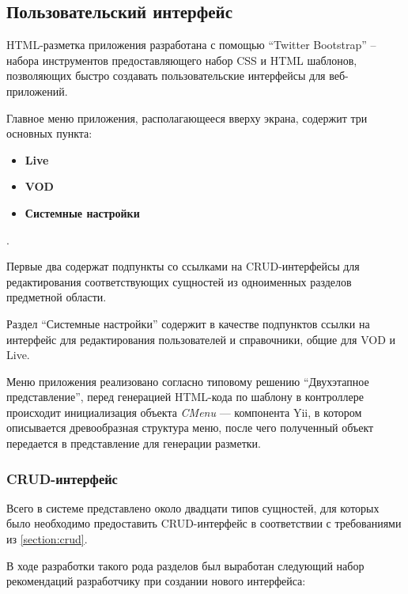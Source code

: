 \subsection{Пользовательский интерфейс}

HTML-разметка приложения разработана с помощью ``Twitter Bootstrap'' -- набора инструментов
предоставляющего набор CSS и HTML шаблонов, позволяющих быстро создавать пользовательские
интерфейсы для веб-приложений.


Главное меню приложения, располагающееся вверху экрана, содержит три основных пункта:
\begin{itemize}
\item{
\textbf{Live}
}
\item{\textbf{VOD}}
\item{\textbf{Системные настройки}}
\end{itemize}.

Первые два содержат подпункты со ссылками на CRUD-интерфейсы для редактирования
соответствующих сущностей из одноименных разделов предметной области.

Раздел ``Системные настройки'' содержит в качестве подпунктов ссылки на интерфейс для 
редактирования пользователей и справочники, общие для VOD и Live.

Меню приложения реализовано согласно типовому решению ``Двухэтапное представление''\cite{fowler},
перед генерацией HTML-кода по шаблону в контроллере происходит инициализация объекта 
\textit{CMenu} --- компонента Yii, в котором описывается древообразная структура меню,
после чего полученный объект передается в представление для генерации разметки. 

\subsubsection{CRUD-интерфейс}
Всего в системе представлено около двадцати типов сущностей, для которых было необходимо
предоставить CRUD-интерфейс в соответствии с требованиями из \ref{section:crud}.

В ходе разработки такого рода разделов был выработан следующий набор рекомендаций
разработчику при создании нового интерфейса:


